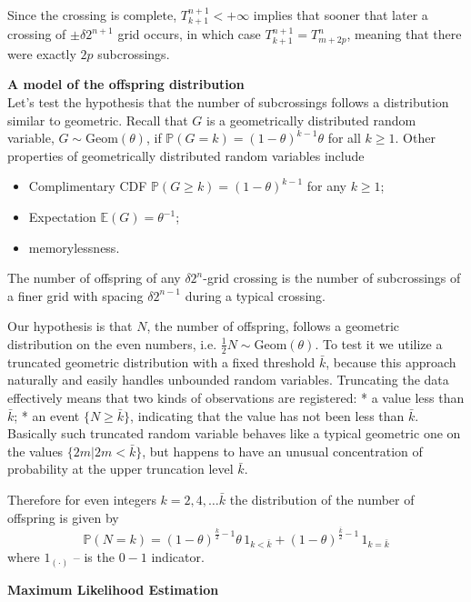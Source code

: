 \documentclass[a4paper]{report}
\begin{document}
Since the crossing is complete, $T^{n+1}_{k+1}<+\infty$ implies that sooner that later a crossing of $\pm\delta 2^{n+1}$ grid occurs, in which case $T^{n+1}_{k+1}=T^n_{m+2p}$, meaning that there were exactly $2p$ subcrossings.

\noindent \textbf{A model of the offspring distribution} \hfill \\

Let's test the hypothesis that the number of subcrossings follows a distribution similar to geometric. Recall that $G$ is a geometrically distributed random variable, $G\sim \text{Geom}(\theta)$, if $\mathbb{P}(G=k) = {(1-\theta)}^{k-1}\theta$ for all $k\geq1$. Other properties of geometrically distributed random variables include
\begin{itemize}
	\item Complimentary CDF $\mathbb{P}(G\geq k) = {(1-\theta)}^{k-1}$ for any $k\geq1$;
	\item Expectation $\mathbb{E}(G) = \theta^{-1}$;
	\item memorylessness.
\end{itemize}

The number of offspring of any $\delta 2^n$-grid crossing is the number of subcrossings of a finer grid with spacing $\delta 2^{n-1}$ during a typical crossing.

Our hypothesis is that $N$, the number of offspring, follows a geometric distribution on the even numbers, i.e. $\frac{1}{2}N\sim \text{Geom}(\theta)$. To test it we utilize a truncated geometric distribution with a fixed threshold $\bar{k}$, because this approach  naturally and easily handles unbounded random variables. Truncating the data effectively means that two kinds of observations are registered:
 * a value less than $\bar{k}$;
 * an event $\big\{N\geq \bar{k}\big\}$, indicating that the value has not been less than $\bar{k}$.
Basically such truncated random variable behaves like a typical geometric one on the values $\big\{ \left . 2m\right \rvert 2m < \bar{k}\big\}$, but happens to have an unusual concentration of probability at the upper truncation level $\bar{k}$.

Therefore for even integers $k=2,4,\ldots\bar{k}$ the distribution of the number of offspring is given by
$$\mathbb{P}(N=k) = {(1-\theta)}^{\frac{k}{2}-1}\theta\,1_{k<\bar{k}} + {(1-\theta)}^{\frac{\bar{k}}{2}-1}\,1_{k = \bar{k}}$$
where $1_{(\cdot)}$ -- is the $0-1$ indicator.

\noindent \textbf{Maximum Likelihood Estimation} \hfill \\
\end{document}
